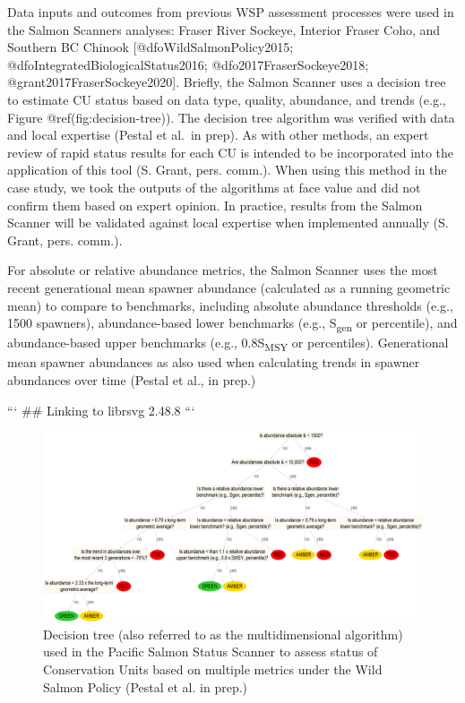 \documentclass[
]{article}
\begin{document}
Data inputs and outcomes from previous WSP assessment processes were
used in the Salmon Scanners analyses: Fraser River Sockeye, Interior
Fraser Coho, and Southern BC Chinook {[}@dfoWildSalmonPolicy2015;
@dfoIntegratedBiologicalStatus2016; @dfo2017FraserSockeye2018;
@grant2017FraserSockeye2020{]}. Briefly, the Salmon Scanner uses a
decision tree to estimate CU status based on data type, quality,
abundance, and trends (e.g., Figure @ref(fig:decision-tree)). The
decision tree algorithm was verified with data and local expertise
(Pestal et al.~in prep). As with other methods, an expert review of
rapid status results for each CU is intended to be incorporated into the
application of this tool (S. Grant, pers. comm.). When using this method
in the case study, we took the outputs of the algorithms at face value
and did not confirm them based on expert opinion. In practice, results
from the Salmon Scanner will be validated against local expertise when
implemented annually (S. Grant, pers. comm.).

For absolute or relative abundance metrics, the Salmon Scanner uses the
most recent generational mean spawner abundance (calculated as a running
geometric mean) to compare to benchmarks, including absolute abundance
thresholds (e.g., 1500 spawners), abundance-based lower benchmarks
(e.g., S\textsubscript{gen} or percentile), and abundance-based upper
benchmarks (e.g., 0.8S\textsubscript{MSY} or percentiles). Generational
mean spawner abundances as also used when calculating trends in spawner
abundances over time (Pestal et al., in prep.)

\newpage
\begin{landscape}

```
## Linking to librsvg 2.48.8
```

\begin{figure}

{\centering \includegraphics[width=1\linewidth]{figure/decision_tree} 

}

\caption{Decision tree (also referred to as the multidimensional algorithm) used in the Pacific Salmon Status Scanner to assess status of Conservation Units based on multiple metrics under the Wild Salmon Policy (Pestal et al. in prep.)}\label{fig:decision-tree}
\end{figure}
\end{landscape}
\end{document}

